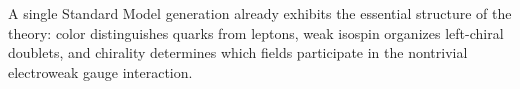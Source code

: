 \documentclass[11pt,a4paper]{article}
\begin{document}

\begin{takehomebox}
\vspace{0.25cm}
A single Standard Model generation already exhibits the essential structure of the theory: color distinguishes quarks from leptons, weak isospin organizes left-chiral doublets, and chirality determines which fields participate in the nontrivial electroweak gauge interaction.
\end{takehomebox}
\end{document}
